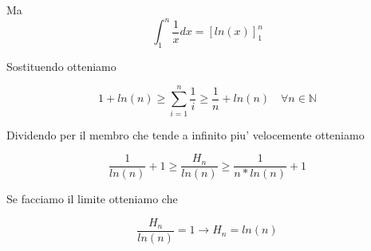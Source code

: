 \documentclass{article}
\begin{document}
        Ma
        \begin{equation*}
          \int^n_1 \frac{1}{x}dx=[ln(x)]^n_1
        \end{equation*}
        \begin{flushleft}
          Sostituendo otteniamo 
        \end{flushleft}
        \begin{equation*}
          1+ln(n) \geq \sum_{i=1}^n \frac{1}{i} \geq \frac{1}{n} +ln(n) \quad \forall n \in \mathbb{N}
        \end{equation*}
        \begin{flushleft}
          Dividendo per il membro che tende a infinito piu' velocemente otteniamo
        \end{flushleft}
        \begin{equation*}
          \frac{1}{ln(n)} +1 \geq \frac{H_n}{ln(n)} \geq \frac{1}{n*ln(n)} +1
        \end{equation*}
        \begin{flushleft}
          Se facciamo il limite otteniamo che
        \end{flushleft}
        \begin{equation*}
          \frac{H_n}{ln(n)}=1 \to H_n=ln(n)
        \end{equation*}
\end{document}
